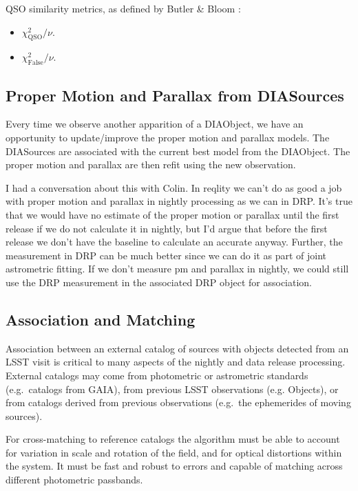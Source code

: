 QSO similarity metrics, as defined by Butler \& Bloom \cite{2011AJ....141...93B}:

\begin{itemize}
\item{$\chi_{\mathrm{QSO}}^2 / \nu$.}
\item{$\chi_{\mathrm{False}}^2 / \nu$.}
\end{itemize}

\subsection{Proper Motion and Parallax from DIASources}
\label{sec:acStellarMotionFitting}
Every time we observe another apparition of a DIAObject, we have an opportunity to update/improve the proper motion and parallax models.  The DIASources are associated with the current best model from the DIAObject.  The proper motion and parallax are then refit using the new observation.

\begin{note}
I had a conversation about this with Colin.  In reqlity we can't do as good a job with proper motion and parallax in nightly processing as we can in DRP.  It's true that we would have no estimate of the proper motion or parallax until the first release if we do not calculate it in nightly, but I'd argue that before the first release we don't have the baseline to calculate an accurate anyway.  Further, the measurement in DRP can be much better since we can do it as part of joint astrometric fitting.  If we don't measure pm and parallax in nightly, we could still use the DRP measurement in the associated DRP object for association.
\end{note}

\subsection{Association and Matching}
\label{sec:acMatching}

Association between an external catalog of sources with objects
detected from an LSST visit is critical to many aspects of the nightly
and data release processing. External catalogs may come from
photometric or astrometric standards (e.g.\ catalogs from GAIA), from
previous LSST observations (e.g. Objects), or from catalogs derived
from previous observations (e.g.\ the ephemerides of moving
sources).

For cross-matching to reference catalogs the algorithm must be able to
account for variation in scale and rotation of the field, and for
optical distortions within the system. It must be fast and robust to
errors and capable of matching across different photometric passbands.

